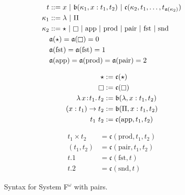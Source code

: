 
\begin{figure}
    \centering
    \begin{align*}
        t &::= x\ |\ \mathfrak{b}(\kappa_1, x : t_1, t_2)\ |\ \mathfrak{c}(\kappa_2, t_1, \ldots, t_{\mathfrak{a}(\kappa_2)}) \\
        \kappa_1 &::= \lambda\ |\ \Pi \\
        \kappa_2 &::=\star\ |\ \kind\ |\ \text{app}\ |\ \text{prod}\ |\ \text{pair}\ |\ \text{fst}\ |\ \text{snd} \\
        &\mathfrak{a}(\star) = \mathfrak{a}(\kind) = 0 \\
        &\mathfrak{a}(\text{fst}) = \mathfrak{a}(\text{fst}) = 1 \\
        &\mathfrak{a}(\text{app}) = \mathfrak{a}(\text{prod}) = \mathfrak{a}(\text{pair}) = 2
    \end{align*}
    \vspace{-.4in}
    \begin{minipage}{0.5\textwidth}
        \begin{align*}
            \star &:= \mathfrak{c}(\star) \\
            \kind &:= \mathfrak{c}(\kind) \\
            \abs{\lambda}{x}{t_1}{t_2} &:= \mathfrak{b}(\lambda, x : t_1, t_2) \\
            (x : t_1) \to t_2 &:= \mathfrak{b}(\Pi, x : t_1, t_2) \\
            t_1\ t_2 &:= \mathfrak{c}(\text{app}, t_1, t_2)
        \end{align*}
    \end{minipage}%
    \begin{minipage}{0.5\textwidth}
        \begin{align*}
            t_1 \times t_2 &= \mathfrak{c}(\text{prod}, t_1, t_2) \\
            (t_1, t_2) &= \mathfrak{c}(\text{pair}, t_1, t_2) \\
            t.1 &= \mathfrak{c}(\text{fst}, t) \\
            t.2 &= \mathfrak{c}(\text{snd}, t)
        \end{align*}
    \end{minipage}
    \caption{Syntax for System F$^\omega$ with pairs.}
    \label{fig:syntax_fp}
\end{figure}

